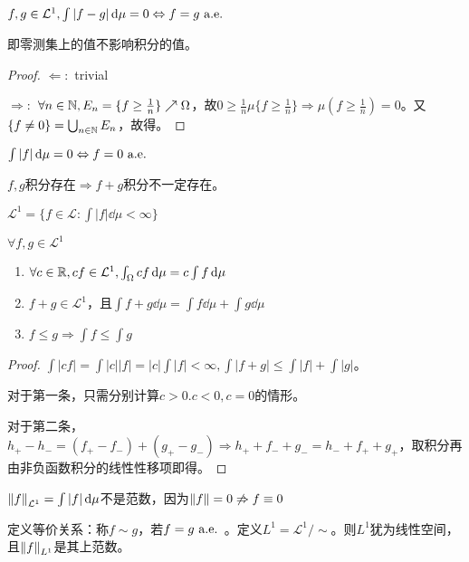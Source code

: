 \documentclass{ctexart}
\begin{document}
\begin{Eg}
  $f,g\in\mathcal{L}^{1},\int |f-g|\,\mathrm{d}\mu=0\Leftrightarrow f=g\text{ a.e. }$
\end{Eg}
即零测集上的值不影响积分的值。

\begin{proof}
  $\Leftarrow:$ trivial

  $\Rightarrow:$ $\forall n\in\mathbb{N},E_{n}=\{f\geq \frac{1}{n}\}\nearrow \Omega$，故$0\geq\frac{1}{n}\mu\{f\geq\frac{1}{n}\}\Rightarrow \mu(f\geq \frac{1}{n})=0$。又$\{f\neq 0\}=\bigcup_{n\in\mathbb{N}}E_{n}$，故得。
\end{proof}

\begin{Cor}
  $\int |f|\,\mathrm{d}\mu=0\Leftrightarrow f=0\text{ a.e. }$
\end{Cor}

$f,g$积分存在$\Rightarrow f+g$积分不一定存在。

\begin{Def}
  $\mathcal{L^{1}}=\{f\in\mathcal{L}:\int|f|\dd\mu<\infty\}$
\end{Def}

\begin{Lemma}
  $\forall f,g\in\mathcal{L}^{1}$
  \begin{enumerate}
  \item $\forall c\in\mathbb{R},cf\in \mathcal{L}^{1},\int_{\Omega}cf\,\mathrm{d}\mu=c\int f\,\mathrm{d}\mu$
  \item $f+g\in\mathcal{L^{1}}$，且$\int f+g\dd\mu=\int f\dd\mu+\int g\dd\mu$
  \item $f\leq g\Rightarrow \int f\leq \int g$
  \end{enumerate}
\end{Lemma}

\begin{proof}
  $\int |cf|=\int |c||f|=|c|\int |f|<\infty,\int|f+g|\leq \int |f|+\int|g|$。

  对于第一条，只需分别计算$c>0.c<0,c=0$的情形。

  对于第二条，$h_{+}-h_{-}=(f_{+}-f_{-})+(g_{+}-g_{-})\Rightarrow h_{+}+f_{-}+g_{-}=h_{-}+f_{+}+g_{+}$，取积分再由非负函数积分的线性性移项即得。
\end{proof}

$\left\|f\right\|_{\mathcal L^{1}}=\int |f|\,\mathrm{d}\mu$不是范数，因为$\left\|f\right\|=0\not\Rightarrow f\equiv 0$

\begin{Def}
  定义等价关系：称$f\sim g$，若$f=g\text{ a.e. }$。定义$L^{1}=\mathcal L^{1}/\sim$。则$L^{1}$犹为线性空间，且$\left\|f\right\|_{L^{1}}$是其上范数。
\end{Def}
\end{document}
